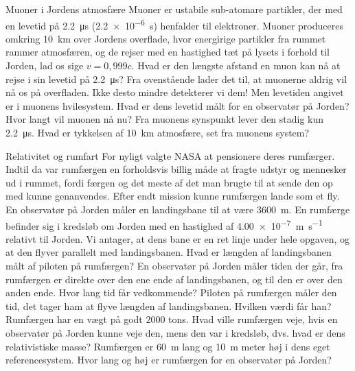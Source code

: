 \documentclass[crop=false, class=memoir]{standalone}
\begin{document}
\begin{opgave}[1]{Muoner i Jordens atmosfære}
	Muoner er ustabile sub-atomare partikler, der med en levetid på \SI{2,2}{\micro\second} (\SI{2,2e-6}{s}) henfalder til elektroner.
	Muoner produceres omkring \SI{10}{\km} over Jordens overflade, hvor energirige partikler fra rummet rammer
	atmosfæren, og de rejser med en hastighed tæt på lysets i forhold til Jorden, lad os sige $v = 0,999c$.
	\opg Hvad er den længste afstand en muon kan nå at rejse i sin levetid på \SI{2,2}{\micro\second}?
	\opg Fra ovenstående lader det til, at muonerne aldrig vil nå os på overfladen. Ikke desto mindre detekterer vi
	dem! Men levetiden angivet er i muonens hvilesystem. Hvad er dens levetid målt for en observatør på
	Jorden?
	\opg Hvor langt vil muonen nå nu?
	\opg Fra muonens synspunkt lever den stadig kun \SI{2,2}{\micro\second}. Hvad er tykkelsen af \SI{10}{\km} atmosfære, set fra
	muonens system?
\end{opgave}

\begin{opgave}[1]{Relativitet og rumfart}
	For nyligt valgte NASA at pensionere deres rumfærger. Indtil da var rumfærgen en forholdsvis billig måde at
	fragte udstyr og mennesker ud i rummet, fordi færgen og det meste af det man brugte til at sende den op med
	kunne genanvendes. Efter endt mission kunne rumfærgen lande som et fly.\\
	\indent
	En observatør på Jorden måler en landingsbane til at være \SI{3600}{\m}. En rumfærge befinder sig i kredsløb om
	Jorden med en hastighed af \SI{4,00e-7}{\m\per\s} relativt til Jorden. Vi antager, at dens bane er en ret linje under hele
	opgaven, og at den flyver parallelt med landingsbanen.
	\opg Hvad er længden af landingsbanen målt af piloten på rumfærgen?
	\opg En observatør på Jorden måler tiden der går, fra rumfærgen er direkte over den ene ende af landingsbanen,
	og til den er over den anden ende. Hvor lang tid får vedkommende?
	\opg Piloten på rumfærgen måler den tid, det tager ham at flyve længden af landingsbanen. Hvilken værdi får
	han?
	\opg Rumfærgen har en vægt på godt $2000$ tons. Hvad ville rumfærgen veje, hvis en observatør på Jorden
	kunne veje den, mens den var i kredsløb, dvs. hvad er dens relativistiske masse?
	\opg Rumfærgen er \SI{60}{\m} lang og \SI{10}{\m} meter høj i dens eget referencesystem. Hvor lang og høj er rumfærgen
	for en observatør på Jorden?
\end{opgave}
\end{document}
